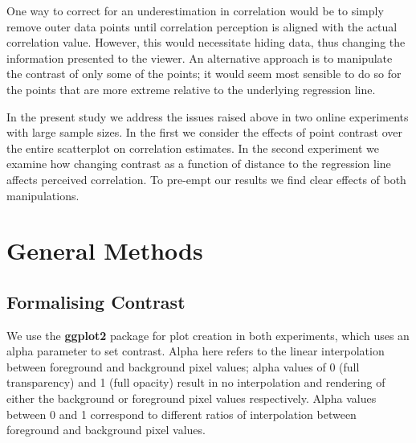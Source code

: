 \documentclass[preprint, 3p,
authoryear]{elsarticle} %
\begin{document}
One way to correct for an underestimation in correlation would be to
simply remove outer data points until correlation perception is aligned
with the actual correlation value. However, this would necessitate
hiding data, thus changing the information presented to the viewer. An
alternative approach is to manipulate the contrast of only some of the
points; it would seem most sensible to do so for the points that are
more extreme relative to the underlying regression line.

In the present study we address the issues raised above in two online
experiments with large sample sizes. In the first we consider the
effects of point contrast over the entire scatterplot on correlation
estimates. In the second experiment we examine how changing contrast as
a function of distance to the regression line affects perceived
correlation. To pre-empt our results we find clear effects of both
manipulations.

\hypertarget{general-methods}{%
\section{General Methods}\label{general-methods}}

\hypertarget{formalising-contrast}{%
\subsection{Formalising Contrast}\label{formalising-contrast}}

We use the \textbf{ggplot2} \citep{hadley_gg2016} package for plot
creation in both experiments, which uses an alpha parameter to set
contrast. Alpha here refers to the linear interpolation
\citep{stone_2008} between foreground and background pixel values; alpha
values of 0 (full transparency) and 1 (full opacity) result in no
interpolation and rendering of either the background or foreground pixel
values respectively. Alpha values between 0 and 1 correspond to
different ratios of interpolation between foreground and background
pixel values.
\end{document}
